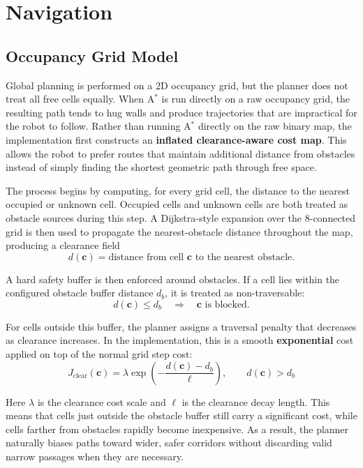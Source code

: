 \documentclass[11pt]{article}
\begin{document}
\section{Navigation}
\subsection{Occupancy Grid Model}
\noindent Global planning is performed on a 2D occupancy grid, but the planner does not treat all free cells equally.
          When A$^{*}$ is run directly on a raw occupancy grid, the resulting path tends to hug walls and produce
          trajectories that are impractical for the robot to follow. Rather than running A$^{*}$ directly on the raw
          binary map, the implementation first constructs an \textbf{inflated clearance-aware cost map}. This allows the
          robot to prefer routes that maintain additional distance from obstacles instead of simply finding the shortest
          geometric path through free space.

The process begins by computing, for every grid cell, the distance to the nearest occupied or unknown cell. Occupied
cells and unknown cells are both treated as obstacle sources during this step. A Dijkstra-style expansion over the
8-connected grid is then used to propagate the nearest-obstacle distance throughout the map, producing a clearance field
\[
d(\mathbf{c}) = \text{distance from cell } \mathbf{c} \text{ to the nearest obstacle}.
\]

A hard safety buffer is then enforced around obstacles. If a cell lies within the configured obstacle buffer distance
$d_b$, it is treated as non-traversable:
\[
d(\mathbf{c}) \le d_b
\quad \Longrightarrow \quad
\mathbf{c} \text{ is blocked.}
\]

For cells outside this buffer, the planner assigns a traversal penalty that decreases as clearance increases. In the
implementation, this is a smooth \textbf{exponential} cost
applied on top of the normal grid step cost:
\[
J_{\text{clear}}(\mathbf{c}) =
\lambda \exp\!\left(
-\frac{d(\mathbf{c}) - d_b}{\ell}
\right),
\qquad d(\mathbf{c}) > d_b
\]

Here $\lambda$ is the clearance cost scale and $\ell$ is the clearance decay length. This means that cells just outside
the obstacle buffer still carry a significant cost, while cells farther from obstacles rapidly become inexpensive. As a
result, the planner naturally biases paths toward wider, safer corridors without discarding valid narrow passages when
they are necessary.
\end{document}
